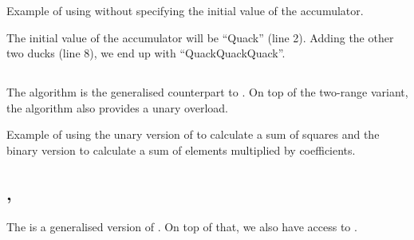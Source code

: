 \begin{codebox}[]{\href{https://compiler-explorer.com/z/5PoEcEvd7}{\ExternalLink}}
\footnotesize Example of using  without specifying the initial value of the accumulator.
\tcblower
{}
\end{codebox}

The initial value of the accumulator will be “Quack” (line 2). Adding the other two ducks (line 8), we end up with “QuackQuackQuack”.

\subsection{\texorpdfstring{}{\texttt{std::transform\_reduce}}}

The  algorithm is the generalised counterpart to \linebreak{}. On top of the two-range variant, the algorithm also provides a unary overload.


\begin{codebox}[breakable]{\href{https://compiler-explorer.com/z/P8ohM19bW}{\ExternalLink}}
\footnotesize Example of using the unary version of  to calculate a sum of squares and the binary version to calculate a sum of elements multiplied by coefficients.
\tcblower
{}
\end{codebox}

\subsection{\texorpdfstring{, }{\texttt{std::inclusive\_scan}, \texttt{std::exclusive\_scan}}}

The  is a generalised version of . On top of that, we also have access to .

